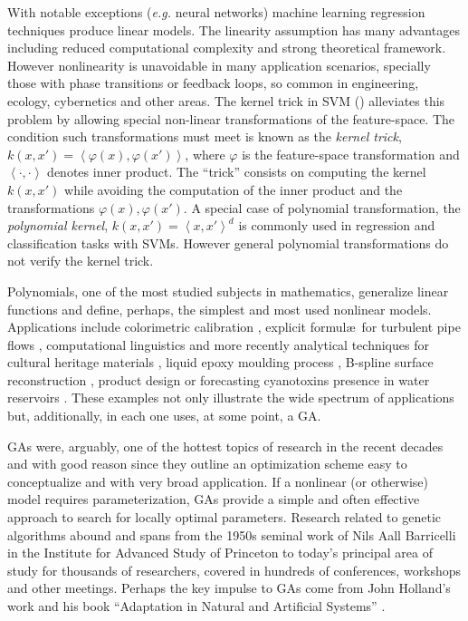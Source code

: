 \documentclass[preprint,authoryear,12pt]{elsarticle}
\newcommand{\at}[1]{\ensuremath{\!\left(#1\right)}}
\begin{document}
With notable exceptions (\emph{e.g.} neural networks) machine learning regression techniques produce linear models. The linearity assumption has many advantages including reduced computational complexity and strong the\-o\-re\-ti\-cal framework. However nonlinearity is unavoidable in many application scenarios, specially those with phase transitions or feedback loops, so common in engineering, ecology, cybernetics and other areas. The kernel trick in \ac{SVM} (\cite{scholkopf1997kernel, liang2012eigen, Bao:2013aa}) alleviates this problem by allowing special non-linear transformations of the feature-space. The condition such transformations must meet is known as the \emph{kernel trick}, $k\at{x,x'} = \left< \varphi\at{x}, \varphi\at{x'} \right>$, where $\varphi$ is the feature-space transformation and $\left<\cdot,\cdot\right>$ denotes inner product. The ``trick'' consists on computing the kernel $k\at{x,x'}$ while avoiding the computation of the inner product and the transformations $\varphi\at{x}, \varphi\at{x'}$. A special case of polynomial transformation, the \emph{polynomial kernel}, $k\at{x,x'} = \left<x,x'\right>^d$ is commonly used in regression and classification tasks with \acp{SVM}. However general polynomial transformations do not verify the kernel trick.

Polynomials, one of the most studied subjects in mathematics, generalize li\-ne\-ar functions and define, perhaps, the simplest and most used nonlinear models. Applications include colorimetric calibration \citep{Mendes:2005aa}, explicit formul\ae\ for turbulent pipe flows
 \citep{Davidson:1999aa}, computational linguistics \citep{Sanchez:2009aa} and more recently analytical techniques for cultural heritage materials \citep{Csefalvayova:2010aa}, liquid epoxy moulding process \citep{Chan:2011aa}, B-spline surface reconstruction \citep{Galvez:2012aa}, product design \citep{Chan:2012aa} or forecasting cyanotoxins presence in water reservoirs \citep{Garcia-Nieto:2013aa}. These examples not only illustrate the wide spectrum of applications but, additionally, in each one uses, at some point, a \ac{GA}.

\acp{GA} were, arguably, one of the hottest topics of research in the recent decades and with good reason since they outline an optimization scheme easy to conceptualize and with very broad application. If a nonlinear (or otherwise) model requires parameterization, \acp{GA} provide a simple and often effective approach to search for locally optimal parameters. Research related to genetic algorithms abound and spans from the 1950s seminal work of Nils Aall Barricelli \citep{Barricelli:1962aa} in the Institute for Advanced Study of Princeton to today's principal area of study for thousands of researchers, covered in hundreds of conferences, workshops and other meetings. Perhaps the key impulse to \acp{GA} come from John Holland's work and his book ``Adaptation in Natural and Artificial Systems'' \citep{Holland:1975aa}. 
\end{document}
